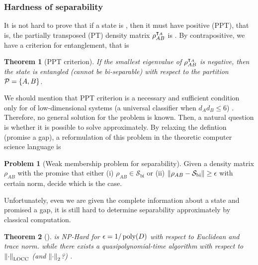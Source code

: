 \documentclass[
reprint,
aps,
pra,
floatfix,
]{revtex4-2}
\theoremstyle{plain}
\newtheorem{theorem}{Theorem}
\theoremstyle{definition}
\newtheorem{problem}{Problem}
\newcommand{\dm}{\rho}
\newcommand{\bi}{\text{bi}}
\newcommand{\ppt}{\textup{PPT}}
\newcommand{\locc}{\textup{LOCC}}
\newcommand{\separable}{\mathcal{S}}
\newcommand{\ppartition}{\mathcal{P}}
\begin{document}
\subsubsection{Hardness of separability}
It is not hard to prove that if a state is , then it must have positive  (PPT), 
that is, the partially transposed (PT) density matrix $\dm_{AB}^{\T_A}$ is  \cite{peresSeparabilityCriterionDensity1996}.
By contrapositive, we have a criterion for entanglement, that is
\begin{theorem}[PPT criterion]\label{thm:ppt}
	If the smallest eigenvalue of  $\dm_{AB}^{\T_A}$ is negative, then the state is entangled (cannot be bi-separable) with respect to the partition $\ppartition=\qty{A,B}$.
\end{theorem}
We should mention that PPT criterion is a necessary and sufficient condition only for  of low-dimensional systems 
(a universal classifier when $d_A d_B \le 6$) \cite{horodeckiSeparabilityMixedStates1996}.
Therefore, no general solution for the  problem is known.
Then, a natural question is whether it is possible to solve  approximately.
By relaxing the defintion (promise a gap), a reformulation of this problem in the theoretic computer science language is
\begin{problem}[Weak membership problem for separability]\label{prm:weak_membership problem_for_separability}
	Given a density matrix $\dm_{AB}$ with the promise that either (i) $\dm_{AB}\in \separable_{\bi}$ or (ii) $\norm{\dm_{AB}-\separable_{\bi}}\ge \epsilon$ with certain norm, decide which is the case.
\end{problem}
Unfortunately, even we are given the complete information about a state and promised a gap, it is still hard to determine separability approximately by classical computation.
\begin{theorem}[\cite{gurvitsClassicalDeterministicComplexity2003}]
	 is NP-Hard for $\epsilon=1/\operatorname{\textup{poly}}(D)$ with respect to Euclidean  and trace norm.
	\cite{ioannouComputationalComplexityQuantum2007}
	\cite{dohertyCompleteFamilySeparability2004}
	while there exists a quasipolynomial-time algorithm with respect to $\norm{\cdot}_{\locc}$ (and $\norm{\cdot}_2$?) \cite{brandaoQuasipolynomialtimeAlgorithmQuantum2011}.
	\label{thm:classical_hardness}
\end{theorem}
\end{document}
